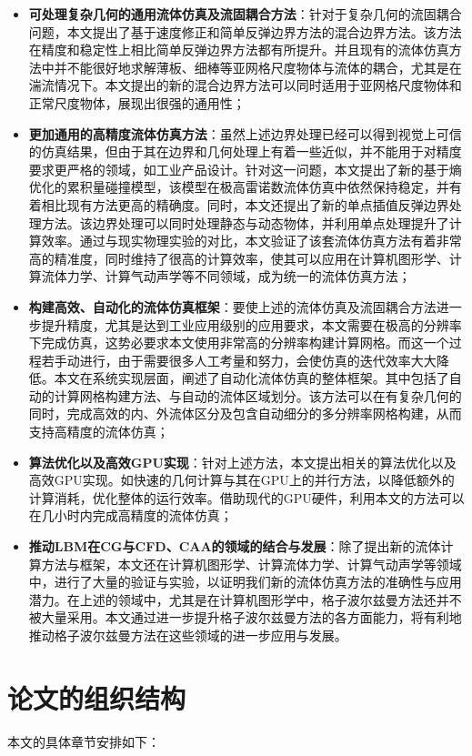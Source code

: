 \begin{itemize}
    \item \textbf{可处理复杂几何的通用流体仿真及流固耦合方法}：针对于复杂几何的流固耦合问题，本文提出了基于速度修正和简单反弹边界方法的混合边界方法。该方法在精度和稳定性上相比简单反弹边界方法都有所提升。并且现有的流体仿真方法中并不能很好地求解薄板、细棒等亚网格尺度物体与流体的耦合，尤其是在湍流情况下。本文提出的新的混合边界方法可以同时适用于亚网格尺度物体和正常尺度物体，展现出很强的通用性；
    \item \textbf{更加通用的高精度流体仿真方法}：虽然上述边界处理已经可以得到视觉上可信的仿真结果，但由于其在边界和几何处理上有着一些近似，并不能用于对精度要求更严格的领域，如工业产品设计。针对这一问题，本文提出了新的基于熵优化的累积量碰撞模型，该模型在极高雷诺数流体仿真中依然保持稳定，并有着相比现有方法更高的精确度。同时，本文还提出了新的单点插值反弹边界处理方法。该边界处理可以同时处理静态与动态物体，并利用单点处理提升了计算效率。通过与现实物理实验的对比，本文验证了该套流体仿真方法有着非常高的精准度，同时维持了很高的计算效率，使其可以应用在计算机图形学、计算流体力学、计算气动声学等不同领域，成为统一的流体仿真方法；
    \item \textbf{构建高效、自动化的流体仿真框架}：要使上述的流体仿真及流固耦合方法进一步提升精度，尤其是达到工业应用级别的应用要求，本文需要在极高的分辨率下完成仿真，这势必要求本文使用非常高的分辨率构建计算网格。而这一个过程若手动进行，由于需要很多人工考量和努力，会使仿真的迭代效率大大降低。本文在系统实现层面，阐述了自动化流体仿真的整体框架。其中包括了自动的计算网格构建方法、与自动的流体区域划分。该方法可以在有复杂几何的同时，完成高效的内、外流体区分及包含自动细分的多分辨率网格构建，从而支持高精度的流体仿真；
    \item \textbf{算法优化以及高效GPU实现}：针对上述方法，本文提出相关的算法优化以及高效GPU实现。如快速的几何计算与其在GPU上的并行方法，以降低额外的计算消耗，优化整体的运行效率。借助现代的GPU硬件，利用本文的方法可以在几小时内完成高精度的流体仿真；
    \item \textbf{推动LBM在CG与CFD、CAA的领域的结合与发展}：除了提出新的流体计算方法与框架，本文还在计算机图形学、计算流体力学、计算气动声学等领域中，进行了大量的验证与实验，以证明我们新的流体仿真方法的准确性与应用潜力。在上述的领域中，尤其是在计算机图形学中，格子波尔兹曼方法还并不被大量采用。本文通过进一步提升格子波尔兹曼方法的各方面能力，将有利地推动格子波尔兹曼方法在这些领域的进一步应用与发展。
\end{itemize}

\section{论文的组织结构}
本文的具体章节安排如下：

